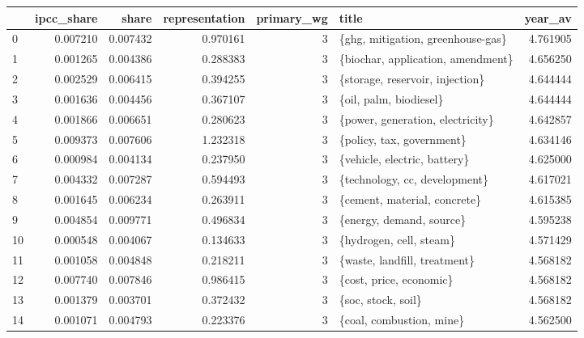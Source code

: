 \begin{tabular}{lrrrrlr}
\toprule
{} &  ipcc\_share &     share &  representation &  primary\_wg &                                   title &   year\_av \\
\midrule
0   &    0.007210 &  0.007432 &        0.970161 &           3 &       \{ghg, mitigation, greenhouse-gas\} &  4.761905 \\
1   &    0.001265 &  0.004386 &        0.288383 &           3 &       \{biochar, application, amendment\} &  4.656250 \\
2   &    0.002529 &  0.006415 &        0.394255 &           3 &         \{storage, reservoir, injection\} &  4.644444 \\
3   &    0.001636 &  0.004456 &        0.367107 &           3 &                  \{oil, palm, biodiesel\} &  4.644444 \\
4   &    0.001866 &  0.006651 &        0.280623 &           3 &        \{power, generation, electricity\} &  4.642857 \\
5   &    0.009373 &  0.007606 &        1.232318 &           3 &               \{policy, tax, government\} &  4.634146 \\
6   &    0.000984 &  0.004134 &        0.237950 &           3 &            \{vehicle, electric, battery\} &  4.625000 \\
7   &    0.004332 &  0.007287 &        0.594493 &           3 &           \{technology, cc, development\} &  4.617021 \\
8   &    0.001645 &  0.006234 &        0.263911 &           3 &            \{cement, material, concrete\} &  4.615385 \\
9   &    0.004854 &  0.009771 &        0.496834 &           3 &                \{energy, demand, source\} &  4.595238 \\
10  &    0.000548 &  0.004067 &        0.134633 &           3 &                 \{hydrogen, cell, steam\} &  4.571429 \\
11  &    0.001058 &  0.004848 &        0.218211 &           3 &            \{waste, landfill, treatment\} &  4.568182 \\
12  &    0.007740 &  0.007846 &        0.986415 &           3 &                 \{cost, price, economic\} &  4.568182 \\
13  &    0.001379 &  0.003701 &        0.372432 &           3 &                      \{soc, stock, soil\} &  4.568182 \\
14  &    0.001071 &  0.004793 &        0.223376 &           3 &                \{coal, combustion, mine\} &  4.562500 \\

\end{tabular}
